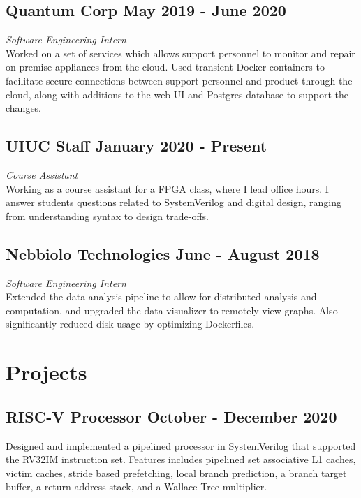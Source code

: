 \documentclass[letterpaper,11pt]{article}
\begin{document}
    \subsection{Quantum Corp \null\hfill May 2019 - June 2020}
    \vspace*{-2mm}
    \emph{Software Engineering Intern} \null\hfill \emph{}\\
    Worked on a set of services which allows support personnel to monitor and repair on-premise appliances from the cloud. Used transient Docker containers to facilitate secure connections between support personnel and product through the cloud, along with additions to the web UI and Postgres database to support the changes.
    \vspace*{-2mm}
    \subsection{UIUC Staff \null\hfill January 2020 - Present}
    \vspace*{-2mm}
    \emph{Course Assistant} \null\hfill \emph{}\\
    Working as a course assistant for a FPGA class, where I lead office hours. I answer students questions related to SystemVerilog and digital design, ranging from understanding syntax to design trade-offs.
    \vspace*{-2mm}
    \subsection{Nebbiolo Technologies \null\hfill June - August 2018}
    \vspace*{-2mm}
    \emph{Software Engineering Intern} \null\hfill \emph{}\\
    Extended the data analysis pipeline to allow for distributed analysis and computation, and upgraded the data visualizer to remotely view graphs. Also significantly reduced disk usage by optimizing Dockerfiles.
    \vspace*{-2mm}
\section{Projects}
    \subsection{RISC-V Processor \null\hfill October - December 2020}
    \vspace*{-2mm}
    Designed and implemented a pipelined processor in SystemVerilog that supported the RV32IM instruction set. Features includes pipelined set associative L1 caches, victim caches, stride based prefetching, local branch prediction, a branch target buffer, a return address stack, and a Wallace Tree multiplier.
    \vspace*{-2mm}
\end{document}
